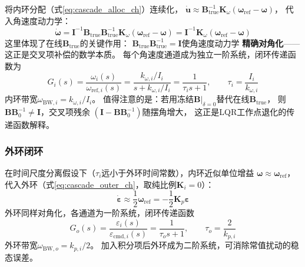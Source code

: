 将内环分配（式\ref{eq:cascade_alloc_ch}）连续化，
$\dot{\mathbf{u}}\approx\mathbf{B}_{\mathrm{true}}^{-1}\mathbf{K}_\omega
(\boldsymbol{\omega}_{\mathrm{ref}}-\boldsymbol{\omega})$，
代入角速度动力学：
\begin{equation}
    \dot{\boldsymbol{\omega}}
    = \mathbf{I}^{-1}\mathbf{B}_{\mathrm{true}}\mathbf{B}_{\mathrm{true}}^{-1}
      \mathbf{K}_\omega(\boldsymbol{\omega}_{\mathrm{ref}}-\boldsymbol{\omega})
    = \mathbf{I}^{-1}\mathbf{K}_\omega(\boldsymbol{\omega}_{\mathrm{ref}}-\boldsymbol{\omega})
    \label{eq:cascade_inner_dot}
\end{equation}
这里体现了在线$\mathbf{B}_{\mathrm{true}}$的关键作用：
$\mathbf{B}_{\mathrm{true}}\mathbf{B}_{\mathrm{true}}^{-1}=\mathbf{I}$使角速度动力学
\textbf{精确对角化}——这正是交叉项补偿的数学本质。
每个角速度通道成为独立一阶系统，闭环传递函数为
\begin{equation}
    G_i(s) = \frac{\omega_i(s)}{\omega_{\mathrm{ref},i}(s)}
    = \frac{k_{\omega,i}/I_i}{s + k_{\omega,i}/I_i}
    = \frac{1}{\tau_i s + 1},\qquad
    \tau_i = \frac{I_i}{k_{\omega,i}}
    \label{eq:cascade_inner_tf}
\end{equation}
内环带宽$\omega_{\mathrm{BW},i}=k_{\omega,i}/I_i$。
值得注意的是：若用冻结$\mathbf{B}|_{\delta=0}$替代在线$\mathbf{B}_{\mathrm{true}}$，
则$\mathbf{B}\mathbf{B}_0^{-1}\neq\mathbf{I}$，交叉项残余
$(\mathbf{I}-\mathbf{B}\mathbf{B}_0^{-1})$随摆角增大，
这正是LQR工作点退化的传递函数解释。

\subsubsection{外环闭环}

在时间尺度分离假设下（$\tau_i$远小于外环时间常数），内环近似单位增益
$\boldsymbol{\omega}\approx\boldsymbol{\omega}_{\mathrm{ref}}$，
代入外环（式\ref{eq:cascade_outer_ch}，取纯比例$\mathbf{K}_i=0$）：
\begin{equation}
    \dot{\boldsymbol{\varepsilon}}
    \approx \frac{1}{2}\boldsymbol{\omega}_{\mathrm{ref}}
    = -\frac{1}{2}\mathbf{K}_p\boldsymbol{\varepsilon}
    \label{eq:cascade_outer_dot}
\end{equation}
外环同样对角化，各通道为一阶系统，闭环传递函数
\begin{equation}
    G_o(s) = \frac{\varepsilon_i(s)}{\varepsilon_{\mathrm{cmd},i}(s)}
    = \frac{1}{\tau_o s + 1},\qquad
    \tau_o = \frac{2}{k_{p,i}}
    \label{eq:cascade_outer_tf}
\end{equation}
外环带宽$\omega_{\mathrm{BW},o}=k_{p,i}/2$。
加入积分项后外环成为二阶系统，可消除常值扰动的稳态误差。

